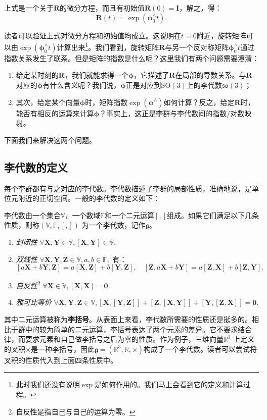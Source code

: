 上式是一个关于$\bm{R}$的微分方程，而且有初始值$\bm{R}(0) = \bm{I}$，解之，得：
\begin{equation}
\label{eq:so3ode}
\bm{R}(t) = \exp \left( \boldsymbol{\phi}_0^\wedge t \right).
\end{equation}

读者可以验证上式对微分方程和初始值均成立。这说明在$t = 0$附近，旋转矩阵可以由$\exp \left( \boldsymbol{\phi}_0^\wedge t \right)$计算出来\footnote{此时我们还没有说明$\exp$是如何作用的。我们马上会看到它的定义和计算过程。}。我们看到，旋转矩阵$\bm{R}$与另一个反对称矩阵$\boldsymbol{\phi}_0^\wedge t$通过指数关系发生了联系。但是矩阵的指数是什么呢？这里我们有两个问题需要澄清：

\begin{enumerate}
	\item 给定某时刻的$\bm{R}$，我们就能求得一个$\boldsymbol{\phi}$，它描述了$\bm{R}$在局部的导数关系。与$\bm{R}$对应的$\boldsymbol{\phi}$有什么含义呢？我们说，$\boldsymbol{\phi}$正是对应到$\mathrm{SO}(3)$上的李代数$\mathfrak{so}(3)$；
	\item 其次，给定某个向量$\boldsymbol{\phi}$时，矩阵指数$\exp (\boldsymbol{\phi} ^\wedge )$如何计算？反之，给定$\bm{R}$时，能否有相反的运算来计算$\boldsymbol{\phi}$？事实上，这正是李群与李代数间的指数/对数映射。
\end{enumerate}

下面我们来解决这两个问题。
\subsection{李代数的定义}
每个李群都有与之对应的李代数。李代数描述了李群的局部性质，准确地说，是单位元附近的正切空间。一般的李代数的定义如下：

李代数由一个集合$\mathbb{V}$，一个数域$\mathbb{F}$和一个二元运算$[,]$组成。如果它们满足以下几条性质，则称$(\mathbb{V}, \mathbb{F}, [,])$ 为一个李代数，记作$\mathfrak{g}$。

\begin{enumerate}
	\item{ \emph{封闭性} } \quad $\forall \bm{X}, \bm{Y} \in \mathbb{V}, [\bm{X}, \bm{Y}] \in \mathbb{V}$.
	\item{ \emph{双线性} } \quad $\forall \bm{X},\bm{Y},\bm{Z} \in \mathbb{V}, a,b \in \mathbb{F}, $ 有：
	\[
	[a\bm{X}+b\bm{Y}, \bm{Z}] = a[\bm{X}, \bm{Z}] + b [ \bm{Y}, \bm{Z} ], \quad [\bm{Z}, a \bm{X}+b\bm{Y}] = a [\bm{Z}, \bm{X} ]+ b [\bm{Z},\bm{Y}] .
	\]
	\item{ \emph{自反性}}\footnote{自反性是指自己与自己的运算为零。} \quad $\forall \bm{X} \in \mathbb{V}, [\bm{X},\bm{X}] = \bm{0}$.
	\item { \emph{雅可比等价} } \quad $\forall \bm{X},\bm{Y},\bm{Z} \in \mathbb{V}, [\bm{X}, [\bm{Y},\bm{Z}] ] + [\bm{Z}, [\bm{X},\bm{Y}] ] + [\bm{Y}, [\bm{Z},\bm{X}]] =\bm{0}$.
\end{enumerate}
其中二元运算被称为\textbf{李括号}。从表面上来看，李代数所需要的性质还是挺多的。相比于群中的较为简单的二元运算，李括号表达了两个元素的差异。它不要求结合律，而要求元素和自己做李括号之后为零的性质。作为例子，三维向量$\mathbb{R}^3$ 上定义的叉积$\times$是一种李括号，因此$\mathfrak{g} = (\mathbb{R}^3, \mathbb{R}, \times)$构成了一个李代数。读者可以尝试将叉积的性质代入到上面四条性质中。

